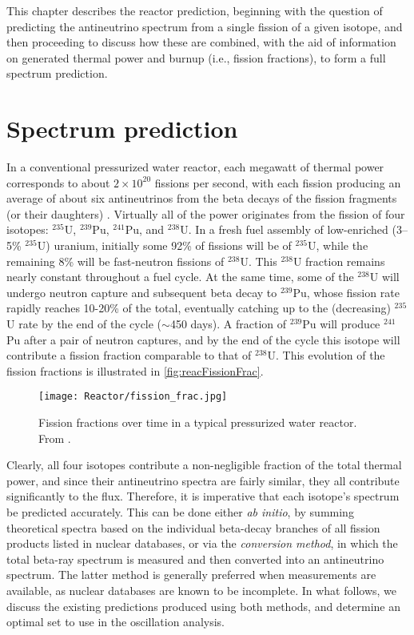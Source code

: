 \documentclass[../thesis.tex]{subfiles}
\begin{document}
This chapter describes the reactor prediction, beginning with the question of predicting the antineutrino spectrum from a single fission of a given isotope, and then proceeding to discuss how these are combined, with the aid of information on generated thermal power and burnup (i.e., fission fractions), to form a full spectrum prediction.

\section{Spectrum prediction}
\label{sec:specpred}

\def\urfive{$^{235}$U\xspace} \def\punine{$^{239}$Pu\xspace}
\def\puone{$^{241}$Pu\xspace} \def\ureight{$^{238}$U\xspace}

In a conventional pressurized water reactor, each megawatt of thermal power corresponds to about $2\times10^{20}$ fissions per second, with each fission producing an average of about six antineutrinos from the beta decays of the fission fragments (or their daughters) \cite{PhysRevC.84.024617}. Virtually all of the power originates from the fission of four isotopes: \urfive, \punine, \puone, and \ureight. In a fresh fuel assembly of low-enriched (3--5\% $^{235}$U) uranium, initially some 92\% of fissions will be of \urfive, while the remaining 8\% will be fast-neutron fissions of \ureight. This \ureight fraction remains nearly constant throughout a fuel cycle. At the same time, some of the \ureight will undergo neutron capture and subsequent beta decay to \punine, whose fission rate rapidly reaches 10-20\% of the total, eventually catching up to the (decreasing) \urfive rate by the end of the cycle ($\sim$450 days). A fraction of \punine will produce \puone after a pair of neutron captures, and by the end of the cycle this isotope will contribute a fission fraction comparable to that of \ureight. This evolution of the fission fractions is illustrated in \autoref{fig:reacFissionFrac}.

\begin{figure}[ht]
  \texttt{[image: Reactor/fission\_frac.jpg]}
  \caption{Fission fractions over time in a typical pressurized water reactor. From \cite{spectrum2017}.}
  \label{fig:reacFissionFrac}
\end{figure}

Clearly, all four isotopes contribute a non-negligible fraction of the total thermal power, and since their antineutrino spectra are fairly similar, they all contribute significantly to the flux. Therefore, it is imperative that each isotope's spectrum be predicted accurately. This can be done either \emph{ab initio}, by summing theoretical spectra based on the individual beta-decay branches of all fission products listed in nuclear databases, or via the \emph{conversion method}, in which the total beta-ray spectrum is measured and then converted into an antineutrino spectrum. The latter method is generally preferred when measurements are available, as nuclear databases are known to be incomplete. In what follows, we discuss the existing predictions produced using both methods, and determine an optimal set to use in the oscillation analysis.
\end{document}
